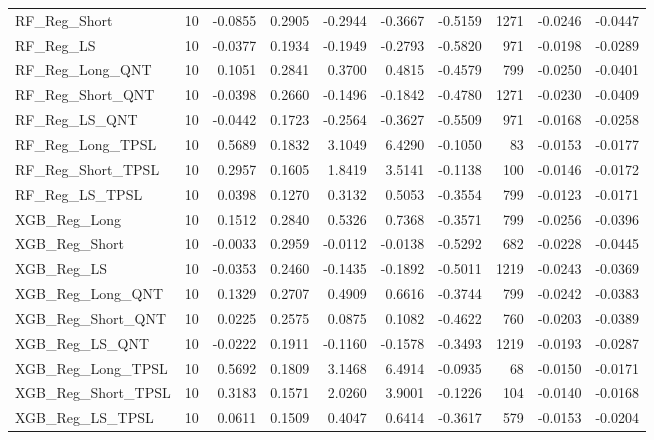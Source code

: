 \begin{tabular}{llrrrrrrrr}
\cline{1-10}
RF\_Reg\_Short & 10 & -0.0855 & 0.2905 & -0.2944 & -0.3667 & -0.5159 & 1271 & -0.0246 & -0.0447 \\
\cline{1-10}
RF\_Reg\_LS & 10 & -0.0377 & 0.1934 & -0.1949 & -0.2793 & -0.5820 & 971 & -0.0198 & -0.0289 \\
\cline{1-10}
RF\_Reg\_Long\_QNT & 10 & 0.1051 & 0.2841 & 0.3700 & 0.4815 & -0.4579 & 799 & -0.0250 & -0.0401 \\
\cline{1-10}
RF\_Reg\_Short\_QNT & 10 & -0.0398 & 0.2660 & -0.1496 & -0.1842 & -0.4780 & 1271 & -0.0230 & -0.0409 \\
\cline{1-10}
RF\_Reg\_LS\_QNT & 10 & -0.0442 & 0.1723 & -0.2564 & -0.3627 & -0.5509 & 971 & -0.0168 & -0.0258 \\
\cline{1-10}
RF\_Reg\_Long\_TPSL & 10 & 0.5689 & 0.1832 & 3.1049 & 6.4290 & -0.1050 & 83 & -0.0153 & -0.0177 \\
\cline{1-10}
RF\_Reg\_Short\_TPSL & 10 & 0.2957 & 0.1605 & 1.8419 & 3.5141 & -0.1138 & 100 & -0.0146 & -0.0172 \\
\cline{1-10}
RF\_Reg\_LS\_TPSL & 10 & 0.0398 & 0.1270 & 0.3132 & 0.5053 & -0.3554 & 799 & -0.0123 & -0.0171 \\
\cline{1-10}
XGB\_Reg\_Long & 10 & 0.1512 & 0.2840 & 0.5326 & 0.7368 & -0.3571 & 799 & -0.0256 & -0.0396 \\
\cline{1-10}
XGB\_Reg\_Short & 10 & -0.0033 & 0.2959 & -0.0112 & -0.0138 & -0.5292 & 682 & -0.0228 & -0.0445 \\
\cline{1-10}
XGB\_Reg\_LS & 10 & -0.0353 & 0.2460 & -0.1435 & -0.1892 & -0.5011 & 1219 & -0.0243 & -0.0369 \\
\cline{1-10}
XGB\_Reg\_Long\_QNT & 10 & 0.1329 & 0.2707 & 0.4909 & 0.6616 & -0.3744 & 799 & -0.0242 & -0.0383 \\
\cline{1-10}
XGB\_Reg\_Short\_QNT & 10 & 0.0225 & 0.2575 & 0.0875 & 0.1082 & -0.4622 & 760 & -0.0203 & -0.0389 \\
\cline{1-10}
XGB\_Reg\_LS\_QNT & 10 & -0.0222 & 0.1911 & -0.1160 & -0.1578 & -0.3493 & 1219 & -0.0193 & -0.0287 \\
\cline{1-10}
XGB\_Reg\_Long\_TPSL & 10 & 0.5692 & 0.1809 & 3.1468 & 6.4914 & -0.0935 & 68 & -0.0150 & -0.0171 \\
\cline{1-10}
XGB\_Reg\_Short\_TPSL & 10 & 0.3183 & 0.1571 & 2.0260 & 3.9001 & -0.1226 & 104 & -0.0140 & -0.0168 \\
\cline{1-10}
XGB\_Reg\_LS\_TPSL & 10 & 0.0611 & 0.1509 & 0.4047 & 0.6414 & -0.3617 & 579 & -0.0153 & -0.0204 \\
\cline{1-10}

\end{tabular}
